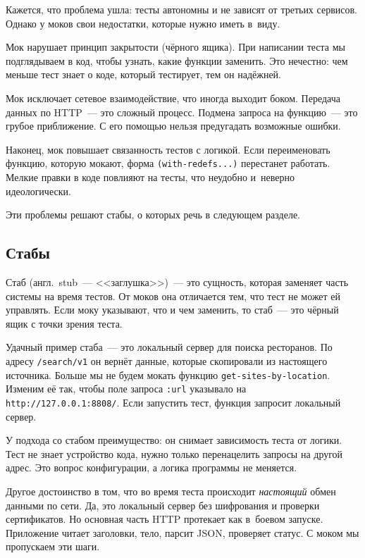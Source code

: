Кажется, что проблема ушла: тесты автономны и не зависят от третьих
сервисов. Однако у моков свои недостатки, которые нужно иметь в~виду.

Мок нарушает принцип закрытости (чёрного ящика). При написании теста мы
подглядываем в код, чтобы узнать, какие функции заменить. Это нечестно: чем
меньше тест знает о коде, который тестирует, тем он надёжней.

Мок исключает сетевое взаимодействие, что иногда выходит боком. Передача данных
по HTTP~--- это сложный процесс. Подмена запроса на функцию~--- это грубое
приближение. С его помощью нельзя предугадать возможные ошибки.

Наконец, мок повышает связанность тестов с логикой. Если переименовать функцию,
которую мокают, форма \verb|(with-redefs...)| перестанет работать. Мелкие правки
в коде повлияют на тесты, что неудобно и~неверно идеологически.

Эти проблемы решают стабы, о которых речь в следующем разделе.

\subsection{Стабы}


Стаб (англ.~stub~--- <<заглушка>>)~--- это сущность, которая заменяет часть
системы на время тестов. От моков она отличается тем, что тест не может ей
управлять. Если моку указывают, что и чем заменить, то стаб~--- это чёрный ящик с
точки зрения теста.

Удачный пример стаба~--- это локальный сервер для поиска ресторанов. По адресу
\verb|/search/v1| он вернёт данные, которые скопировали из настоящего
источника. Больше мы не будем мокать функцию \verb|get-sites-by-location|.
Изменим её так, чтобы поле запроса \verb|:url| указывало на \verb|http://127.0.0.1:8808/|.
Если запустить тест, функция запросит локальный сервер.

У подхода со стабом преимущество: он снимает зависимость теста от логики. Тест
не знает устройство кода, нужно только перенацелить запросы на другой адрес. Это
вопрос конфигурации, а логика программы не меняется.

Другое достоинство в том, что во время теста происходит \emph{настоящий} обмен
данными по сети. Да, это локальный сервер без шифрования и проверки
сертификатов. Но основная часть HTTP протекает как в~боевом запуске. Приложение
читает заголовки, тело, парсит JSON, проверяет статус. С моком мы пропускаем эти
шаги.

